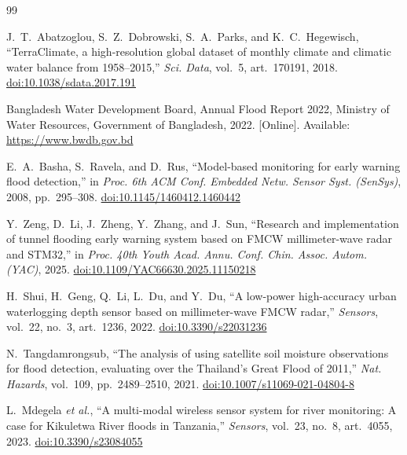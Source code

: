 \documentclass[5p,twocolumn]{elsarticle}
\begin{document}
\begin{thebibliography}{99}

 J.~T.~Abatzoglou, S.~Z.~Dobrowski, S.~A.~Parks, and K.~C.~Hegewisch, ``TerraClimate, a high-resolution global dataset of monthly climate and climatic water balance from 1958--2015,'' \textit{Sci. Data}, vol.~5, art.~170191, 2018. \href{https://doi.org/10.1038/sdata.2017.191}{doi:10.1038/sdata.2017.191}

 Bangladesh Water Development Board, Annual Flood Report 2022, Ministry of Water Resources, Government of Bangladesh, 2022. [Online]. Available: \url{https://www.bwdb.gov.bd}

 E.~A.~Basha, S.~Ravela, and D.~Rus, ``Model-based monitoring for early warning flood detection,'' in \textit{Proc. 6th ACM Conf. Embedded Netw. Sensor Syst. (SenSys)}, 2008, pp.~295--308. \href{https://doi.org/10.1145/1460412.1460442}{doi:10.1145/1460412.1460442}

 Y.~Zeng, D.~Li, J.~Zheng, Y.~Zhang, and J.~Sun, ``Research and implementation of tunnel flooding early warning system based on FMCW millimeter-wave radar and STM32,'' in \textit{Proc. 40th Youth Acad. Annu. Conf. Chin. Assoc. Autom. (YAC)}, 2025. \href{https://doi.org/10.1109/YAC66630.2025.11150218}{doi:10.1109/YAC66630.2025.11150218}

 H.~Shui, H.~Geng, Q.~Li, L.~Du, and Y.~Du, ``A low-power high-accuracy urban waterlogging depth sensor based on millimeter-wave FMCW radar,'' \textit{Sensors}, vol.~22, no.~3, art.~1236, 2022. \href{https://doi.org/10.3390/s22031236}{doi:10.3390/s22031236}

 N.~Tangdamrongsub, ``The analysis of using satellite soil moisture observations for flood detection, evaluating over the Thailand's Great Flood of 2011,'' \textit{Nat. Hazards}, vol.~109, pp.~2489--2510, 2021. \href{https://doi.org/10.1007/s11069-021-04804-8}{doi:10.1007/s11069-021-04804-8}

 L.~Mdegela \textit{et al.}, ``A multi-modal wireless sensor system for river monitoring: A case for Kikuletwa River floods in Tanzania,'' \textit{Sensors}, vol.~23, no.~8, art.~4055, 2023. \href{https://doi.org/10.3390/s23084055}{doi:10.3390/s23084055}


\end{thebibliography}
\end{document}
